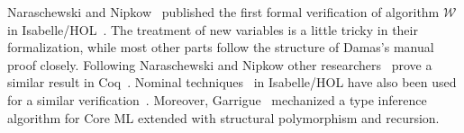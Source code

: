 Naraschewski and Nipkow~\cite{naraschewski1999type} published the first formal
verification of algorithm $\mathcal{W}$ in
Isabelle/HOL~\cite{nipkow2002isabelle}. The treatment of new variables is a little
tricky in their formalization, while most other parts follow the
structure of Damas's manual proof closely.
Following Naraschewski and Nipkow other researchers~\cite{dubois2000proving,dubois1999certification} prove
a similar result in Coq~\cite{Coq}. Nominal
techniques~\cite{urban2008nominalTech} in Isabelle/HOL have also been used for a similar
verification~\cite{urban2008nominal}. Moreover, Garrigue~\cite{garrigue2015certified}
mechanized a type inference algorithm for Core ML extended with structural
polymorphism and recursion.




\begin{comment}
List of (possible) citations:
\begin{itemize}
	\item Guarded impredicative polymorphism (about impredicative polymorphism)
\end{itemize}
\end{comment}

